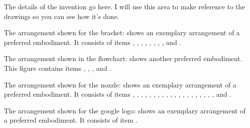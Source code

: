 
\npar The details of the invention go here. I will use this area to make reference to the drawings so you can see how it's done. 

\npar The arrangement shown for the bracket:  shows an 
exemplary arrangement of a preferred embodiment. It consists of items
, , , , 
, , , , and .

\npar The arrangement shown in the flowchart:  
shows another preferred embodiment. This figure contains items
, , , and .

\npar The arrangement shown for the nozzle:  shows an 
exemplary arrangement of a preferred embodiment. It consists of items
, , , , 
, , , ,  
, , , ,  
, , , ,  
, , , , and .

\npar The arrangement shown for the google logo:  shows an 
exemplary arrangement of a preferred embodiment. It consists of item
.
